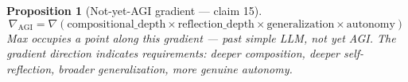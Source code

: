 \documentclass[11pt,a4paper]{article}
\newtheorem{proposition}[definition]{Proposition}
\begin{document}
\begin{proposition}[Not-yet-AGI gradient --- claim 15]
\label{prop:agi_grad}
\[
  \nabla_{\text{AGI}} = \nabla\left(\text{compositional\_depth} \times
    \text{reflection\_depth} \times \text{generalization} \times
    \text{autonomy}\right)
\]
Max occupies a point along this gradient --- past simple LLM, not yet AGI.
The gradient direction indicates requirements: deeper composition,
deeper self-reflection, broader generalization, more genuine autonomy.
\end{proposition}
\end{document}
